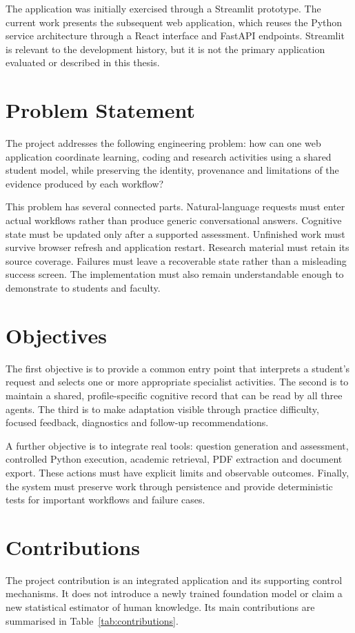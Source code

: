 The application was initially exercised through a Streamlit prototype. The current work presents the subsequent web application, which reuses the Python service architecture through a React interface and FastAPI endpoints. Streamlit is relevant to the development history, but it is not the primary application evaluated or described in this thesis.

\section{Problem Statement}
The project addresses the following engineering problem: how can one web application coordinate learning, coding and research activities using a shared student model, while preserving the identity, provenance and limitations of the evidence produced by each workflow?

This problem has several connected parts. Natural-language requests must enter actual workflows rather than produce generic conversational answers. Cognitive state must be updated only after a supported assessment. Unfinished work must survive browser refresh and application restart. Research material must retain its source coverage. Failures must leave a recoverable state rather than a misleading success screen. The implementation must also remain understandable enough to demonstrate to students and faculty.

\section{Objectives}
The first objective is to provide a common entry point that interprets a student's request and selects one or more appropriate specialist activities. The second is to maintain a shared, profile-specific cognitive record that can be read by all three agents. The third is to make adaptation visible through practice difficulty, focused feedback, diagnostics and follow-up recommendations.

A further objective is to integrate real tools: question generation and assessment, controlled Python execution, academic retrieval, PDF extraction and document export. These actions must have explicit limits and observable outcomes. Finally, the system must preserve work through persistence and provide deterministic tests for important workflows and failure cases.

\section{Contributions}
The project contribution is an integrated application and its supporting control mechanisms. It does not introduce a newly trained foundation model or claim a new statistical estimator of human knowledge. Its main contributions are summarised in Table~\ref{tab:contributions}.

